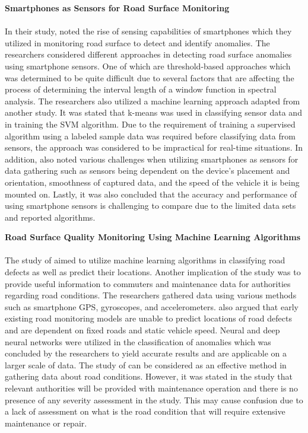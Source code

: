 \noindent\textbf{\large Smartphones as Sensors for Road Surface Monitoring} \\\\
In their study,  noted the rise of sensing capabilities of smartphones which they utilized in monitoring road surface to detect and identify anomalies. The researchers considered different approaches in detecting road surface anomalies using smartphone sensors. One of which are threshold-based approaches which was determined to be quite difficult  due to several factors that are affecting the process of determining the interval length of a window function in spectral analysis. The researchers also utilized a machine learning approach adapted from another study. It was stated that k-means was used in classifying sensor data and in training the SVM algorithm. Due to the requirement of training a supervised algorithm using a labeled sample data was required before classifying data from sensors, the approach was considered to be impractical for real-time situations. In addition,  also noted various challenges when utilizing smartphones as sensors for data gathering such as sensors being dependent on the device’s placement and orientation, smoothness of captured data, and the speed of the vehicle it is being mounted on. Lastly, it was also concluded that the accuracy and performance of using smartphone sensors is challenging to compare due to the limited data sets and reported algorithms.

\noindent\textbf{\large Road Surface Quality Monitoring Using Machine Learning Algorithms} \\\\
The study of  aimed to utilize machine learning algorithms in classifying road defects as well as predict their locations. Another implication of the study was to provide useful information to commuters and maintenance data for authorities regarding road conditions. The researchers gathered data using various methods such as smartphone GPS, gyroscopes, and accelerometers. \cite{singh2021} also argued that early existing road monitoring models are unable to predict locations of road defects and are dependent on fixed roads and static vehicle speed.  Neural and deep neural networks were utilized in the classification of anomalies which was concluded by the researchers to yield accurate results and are applicable on a larger scale of data. The study of  can be considered as an effective method in gathering data about road conditions. However, it was stated in the study that relevant authorities will be provided with maintenance operation and there is no presence of any severity assessment in the study. This may cause confusion due to a lack of assessment on what is the road condition that will require extensive maintenance or repair.

